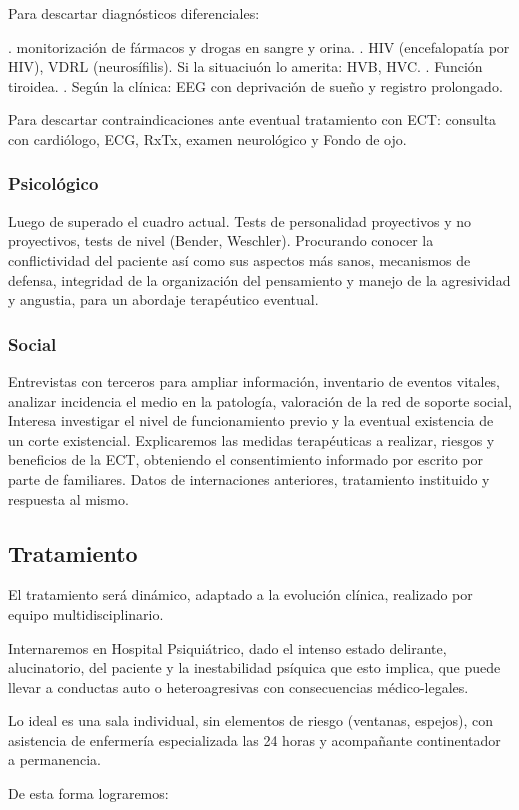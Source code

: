 \documentclass{scrbook}
\begin{document}
Para descartar diagnósticos diferenciales:

. monitorización de fármacos y drogas en sangre y orina.
. HIV (encefalopatía por HIV), VDRL (neurosífilis).  Si la situaciuón lo amerita: HVB, HVC.
. Función tiroidea.
. Según la clínica: EEG con deprivación de sueño y registro prolongado.

Para descartar contraindicaciones ante eventual tratamiento con ECT: consulta con cardiólogo, ECG, RxTx, examen neurológico y Fondo de ojo.
\subsubsection*{Psicológico}
Luego de superado el cuadro actual. Tests de personalidad proyectivos y no proyectivos, tests de nivel (Bender, Weschler). Procurando conocer la conflictividad del paciente así como sus aspectos más sanos, mecanismos de defensa, integridad de la organización del pensamiento y manejo de la agresividad y angustia, para un abordaje terapéutico eventual.
\subsubsection*{Social}
Entrevistas con terceros para ampliar información, inventario de eventos vitales, analizar incidencia el medio en la patología, valoración de la red de soporte social, Interesa investigar el nivel de funcionamiento previo y la eventual existencia de un corte existencial. Explicaremos las medidas terapéuticas a realizar, riesgos y beneficios de la ECT, obteniendo el consentimiento informado por escrito por parte de familiares. Datos de internaciones anteriores, tratamiento instituido y respuesta al mismo.
\subsection*{Tratamiento}
El tratamiento será dinámico, adaptado a la evolución clínica, realizado por equipo multidisciplinario.

Internaremos en Hospital Psiquiátrico, dado el intenso estado delirante, alucinatorio, del paciente y la inestabilidad psíquica que esto implica, que puede llevar a conductas auto o heteroagresivas con consecuencias médico-legales.

Lo ideal es una sala individual, sin elementos de riesgo (ventanas, espejos), con asistencia de enfermería especializada las 24 horas y acompañante continentador a permanencia.

De esta forma lograremos:
\end{document}
